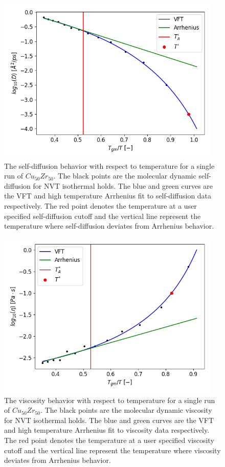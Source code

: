 \documentclass[11pt,a4paper]{article}                                %
\begin{document}
\begin{figure}[H]
\centering
\includegraphics[width=0.95\textwidth]{figures/tprime.png}
\caption{The self-diffusion behavior with respect to temperature for a single run of $Cu_{50}Zr_{50}$. The black points are the molecular dynamic self-diffusion for NVT isothermal holds. The blue and green curves are the VFT and high temperature Arrhenius fit to self-diffusion data respectively. The red point denotes the temperature at a user specified self-diffusion cutoff and the vertical line represent the temperature where self-diffusion deviates from Arrhenius behavior.}
\label{tprime}
\end{figure}

\begin{figure}[H]
\centering
\includegraphics[width=0.95\textwidth]{figures/tstar.png}
\caption{The viscosity behavior with respect to temperature for a single run of $Cu_{50}Zr_{50}$. The black points are the molecular dynamic viscosity for NVT isothermal holds. The blue and green curves are the VFT and high temperature Arrhenius fit to viscosity data respectively. The red point denotes the temperature at a user specified viscosity cutoff and the vertical line represent the temperature where viscosity deviates from Arrhenius behavior.}
\label{tstar}
\end{figure}
\end{document}
